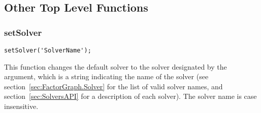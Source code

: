 \subsection{Other Top Level Functions}

\subsubsection{setSolver}

\begin{lstlisting}
setSolver('SolverName');
\end{lstlisting}

This function changes the default solver to the solver designated by the argument, which is a string indicating the name of the solver (see section~\ref{sec:FactorGraph.Solver} for the list of valid solver names, and section~\ref{sec:SolversAPI} for a description of each solver).  The solver name is case insensitive.


%
%
%
%
%
%
%
%


